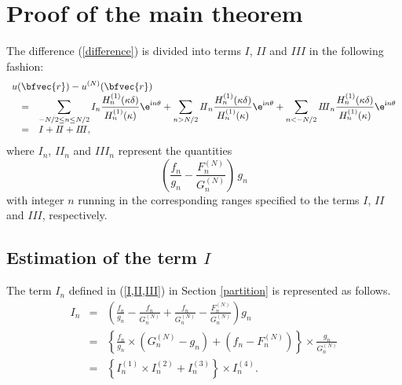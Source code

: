 \section{Proof of the main theorem}
\label{proof}
The difference (\ref{difference}) is divided into terms $I$, $I\!I$ and $I\!I\!I$ in the following fashion:
\begin{eqnarray}
\label{diff2}
\begin{array}{lll}
\lefteqn{u(\bfvec{r})-u^{(N)}(\bfvec{r})} \\
&=& \displaystyle \sum_{-N/2 \le n  \le N/2} I_n \frac{H^{(1)}_n(\kappa \delta)}{H^{(1)}_n(\kappa)} \e^{\mathrm{i} n \theta} + \sum_{n>N/2} {I\!I}_n \frac{H^{(1)}_n(\kappa \delta)}{H^{(1)}_n(\kappa)} \e^{\mathrm{i} n \theta} + \displaystyle \sum_{n<-N/2} {I\!I\!I}_n \frac{H^{(1)}_n(\kappa \delta)}{H^{(1)}_n(\kappa)} \e^{\mathrm{i} n \theta} \\
&=& \displaystyle I + I\!I + I\!I\!I,
\end{array}
\end{eqnarray}
where $I_n$, $I\!I_n$ and $I\!I\!I_n$ represent the quantities
\begin{equation}
\left(\frac{f_n}{g_n}-\frac{F^{(N)}_n}{G^{(N)}_n}\right)\,g_n
\label{I,II,III}
\end{equation}
with integer $n$ running in the corresponding ranges specified to the terms $I$, $I\!I$ and $I\!I\!I$, respectively.

\subsection{Estimation of the term $I$}
\label{i}
The term $I_n$ defined in (\ref{I,II,III}) in Section \ref{partition} is represented as follows.
\begin{eqnarray*}
I_n&=&\displaystyle \left(\frac{f_n}{g_n}-\frac{f_n}{G^{(N)}_n}+\frac{f_n}{G^{(N)}_n}-\frac{F^{(N)}_n}{G^{(N)}_n}\right)g_n \\
&=&\displaystyle \left\{\frac{f_n}{g_n}\times\left(G^{(N)}_n-g_n\right)+\left(f_n-F^{(N)}_n\right)\right\}\times\frac{g_n}{G^{(N)}_n}\\
&=&\left\{I^{(1)}_n\times I^{(2)}_n + I^{(3)}_n\right\}\times I^{(4)}_n.
\end{eqnarray*}


